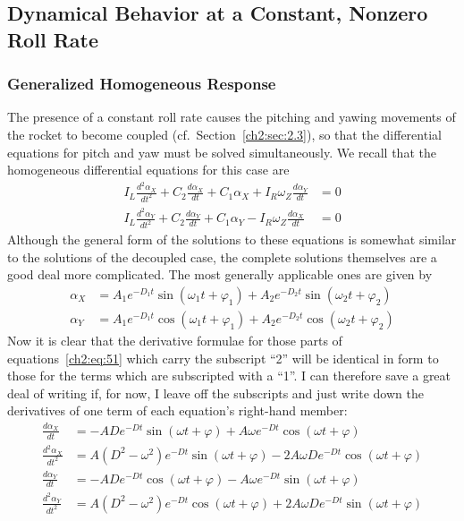 \subsection{Dynamical Behavior at a Constant, Nonzero Roll Rate}\label{ch2:sec:3.2}

\subsubsection{Generalized Homogeneous Response}\label{ch2:sec:3.2.1}

The presence of a constant roll rate causes the pitching and yawing movements
of the rocket to become coupled (cf.\ Section~\ref{ch2:sec:2.3}), so that the
differential equations for pitch and yaw must be solved simultaneously. We
recall that the homogeneous differential equations for this case are
\begin{align*}
I_L\frac{d^2\alpha_X}{dt^2} + C_2\frac{d\alpha_X}{dt} + C_1\alpha_X
  + I_R\omega_Z\frac{d\alpha_Y}{dt} &= 0\\
I_L\frac{d^2\alpha_Y}{dt^2} + C_2\frac{d\alpha_Y}{dt} + C_1\alpha_Y
  - I_R\omega_Z\frac{d\alpha_X}{dt} &= 0
\end{align*}
Although the general form of the solutions to these equations is somewhat
similar to the solutions of the decoupled case, the complete solutions
themselves are a good deal more complicated. The most generally applicable
ones are given by
\begin{equation}\label{ch2:eq:51}
\begin{aligned}
\alpha_X &= A_1 e^{-D_1 t}\sin(\omega_1 t + \varphi_1)
  + A_2 e^{-D_2 t}\sin(\omega_2 t + \varphi_2)\\
\alpha_Y &= A_1 e^{-D_1 t}\cos(\omega_1 t + \varphi_1)
  + A_2 e^{-D_2 t}\cos(\omega_2 t + \varphi_2)
\end{aligned}
\end{equation}
Now it is clear that the derivative formulae for those parts of
equations~\eqref{ch2:eq:51} which carry the subscript ``2'' will be identical
in form to those for the terms which are subscripted with a ``1''. I can
therefore save a great deal of writing if, for now, I leave off the subscripts
and just write down the derivatives of one term of each equation's right-hand
member:
\begin{align*}
\frac{d\alpha_X}{dt} &= -AD e^{-Dt}\sin(\omega t + \varphi)
  + A\omega e^{-Dt}\cos(\omega t + \varphi)\\
\frac{d^2\alpha_X}{dt^2} &= A(D^2 - \omega^2)e^{-Dt}\sin(\omega t + \varphi)
  - 2A\omega D e^{-Dt}\cos(\omega t + \varphi)\\
\frac{d\alpha_Y}{dt} &= -AD e^{-Dt}\cos(\omega t + \varphi)
  - A\omega e^{-Dt}\sin(\omega t + \varphi)\\
\frac{d^2\alpha_Y}{dt^2} &= A(D^2 - \omega^2)e^{-Dt}\cos(\omega t + \varphi)
  + 2A\omega D e^{-Dt}\sin(\omega t + \varphi)
\end{align*}
